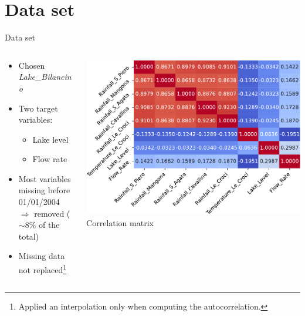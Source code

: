 \documentclass[aspectratio=169, glossy]{beamer}
\begin{document}
\section{Data set}

\begin{frame}{Data set}
  \begin{columns}
    \begin{column}{0.6\columnwidth}
      \begin{itemize}
        \item Chosen \textit{Lake\_Bilancino}
        \item Two target variables:
          \begin{itemize}
            \item Lake level
            \item Flow rate
          \end{itemize}
        \item Most variables missing before 01/01/2004\\
        $\Rightarrow$ removed ($\sim 8\%$ of the total)
        \item Missing data not replaced\footnote{Applied an interpolation only when computing the autocorrelation.}
      \end{itemize}
      \vspace{7em}
    \end{column}
    \begin{column}{0.4\columnwidth}
      \begin{center}
        \includegraphics[width=\columnwidth]{../plots/corr_matrix_new-crop.pdf}\\
        \tiny{Correlation matrix}
      \end{center}
    \end{column}
  \end{columns}
\end{frame}
\end{document}
